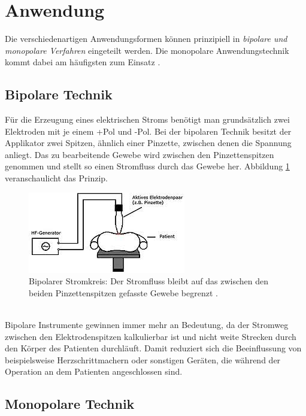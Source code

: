 \documentclass[letterpaper,12pt]{article}
\begin{document}
	\section{Anwendung}
	
		Die verschiedenartigen Anwendungsformen können prinzipiell in \emph{bipolare und monopolare Verfahren} eingeteilt werden. Die monopolare Anwendungstechnik kommt dabei am häufigsten zum Einsatz \cite{kramme2016medizintechnik}.
		
		\subsection{Bipolare Technik}
		
			Für die Erzeugung eines elektrischen Stroms benötigt man grundsätzlich zwei Elektroden mit je einem +Pol und -Pol. Bei der bipolaren Technik besitzt der Applikator zwei Spitzen, ähnlich einer Pinzette, zwischen denen die Spannung anliegt. Das zu bearbeitende Gewebe wird zwischen den Pinzettenspitzen genommen und stellt so einen Stromfluss durch das Gewebe her. Abbildung \ref{fig:bipolareTechnik2} veranschaulicht das Prinzip.
			\begin{figure}[ht] 
				\centering
				\includegraphics[width=0.35\columnwidth]{images/_bipolareTechnik.png}
				\caption{		 
					Bipolarer Stromkreis: Der Stromfluss bleibt auf das zwischen den beiden Pinzettenspitzen gefasste Gewebe begrenzt \cite{wiki:HF}.}
				\label{fig:bipolareTechnik2}
			\end{figure}\\
			Bipolare Instrumente gewinnen immer mehr an Bedeutung, da der Stromweg zwischen den Elektrodenspitzen kalkulierbar ist und nicht weite Strecken durch den Körper des Patienten durchläuft. Damit reduziert sich die Beeinflussung von beispielsweise Herzschrittmachern oder sonstigen Geräten, die während der Operation an dem Patienten angeschlossen sind.
		
		\subsection{Monopolare Technik}
		
\end{document}
